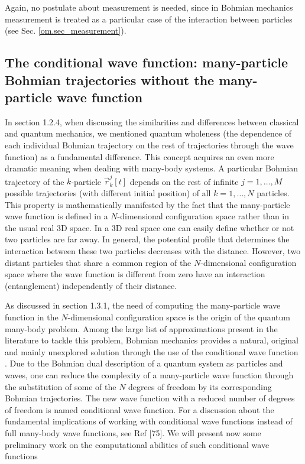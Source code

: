 \documentclass[onecolumn,nofootinbib, secnumarabic, amsmath, nobibnotes,11pt,aps,pra]{revtex4-1}
\newcommand{\sref}[1]{Sec. \ref{#1}}
\begin{document}
Again, no postulate about measurement is needed, since in Bohmian
mechanics measurement is treated as a particular case of the
interaction between particles (see \sref{om.sec_measurement}).

\subsection{The conditional wave function: many-particle Bohmian trajectories without the many-particle wave function}\label{om.sec_many.6}

In section 1.2.4, when discussing the similarities and differences
between classical and quantum mechanics, we mentioned quantum
wholeness (the dependence of each individual Bohmian trajectory on
the rest of trajectories through the wave function) as a fundamental
difference. This concept acquires an even more dramatic meaning when
dealing with many-body systems. A particular Bohmian trajectory of
the $k$-particle $\vec r_k^j[t]$ depends on the rest of infinite $j = 1, \ldots, M$ possible
trajectories (with different initial position) of all $k = 1,\ldots, N$
particles. This property is mathematically manifested by the fact
that the many-particle wave function is defined in a $N$-dimensional
configuration space rather than in the usual real 3D space. In a 3D
real space one can easily define whether or not two particles are
far away. In general, the potential profile that determines the
interaction between these two particles decreases with the distance.
However, two distant particles that share a common region of the
$N$-dimensional configuration space where the wave function is
different from zero have an interaction (entanglement) independently
of their distance.

As discussed in section 1.3.1, the need of computing the
many-particle wave function in the $N$-dimensional configuration
space is the origin of the quantum many-body problem. Among the
large list of approximations present in the literature to tackle
this problem, Bohmian mechanics provides a natural, original and
mainly unexplored solution through the use of the conditional wave
function \cite{om.norsen}. Due to the Bohmian dual description of a quantum
system as particles and waves, one can reduce the complexity of a
many-particle wave function through the substitution of  some of the
$N$ degrees of freedom by its corresponding Bohmian trajectories.
The new wave function with a reduced number of degrees of freedom is
named conditional wave function.  For a discussion about the
fundamental implications of working with conditional wave functions
instead of full many-body wave functions, see Ref [75]. We will
present now  some preliminary work on the computational abilities of such
conditional wave functions
\end{document}
